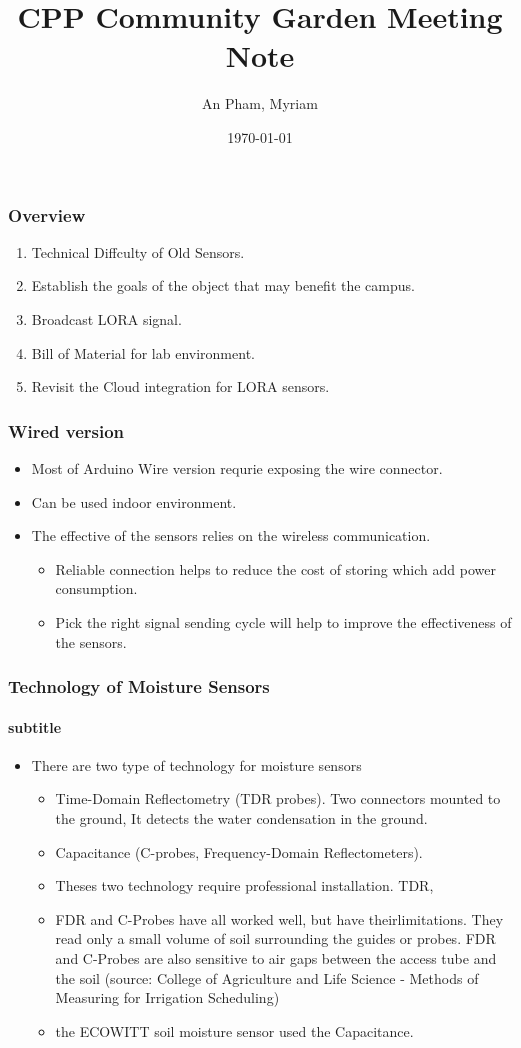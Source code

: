\documentclass{beamer}
\title{CPP Community Garden Meeting Note}
\author{An Pham, Myriam}
\institute{Calpoly Pomona}
\date{\today}
\begin{document}
\frame{\titlepage}

\begin{frame}
\frametitle{Overview}
\begin{enumerate}
  \item Technical Diffculty of Old Sensors.
  \item Establish the goals of the object that may benefit the campus.
  \item Broadcast LORA signal.
  \item Bill of Material for lab environment.
  \item Revisit the Cloud integration for LORA sensors. 
   
 \end{enumerate}
\end{frame}

\begin{frame}
  \frametitle{Wired version }
  \begin{itemize}
    \item Most of Arduino Wire version requrie exposing the wire connector. 
    \item Can be used indoor environment.
    \item The effective of the sensors relies on the wireless communication. 
      \begin{itemize}
        \item Reliable connection helps to reduce the cost of storing which add power consumption. 
	\item Pick the right signal sending cycle will help to improve the effectiveness of the sensors. 
      \end{itemize}
  \end{itemize}
 \end{frame}
 
 \begin{frame}[t]
   \frametitle{Technology of Moisture Sensors}
   \framesubtitle{subtitle}
   \begin{itemize}
     \item There are two type of technology for moisture sensors 
       \begin{itemize}
         \item Time-Domain Reflectometry (TDR probes). Two connectors mounted to the ground, It detects the water condensation in the ground. 
	 \item Capacitance (C-probes, Frequency-Domain Reflectometers). 
	 \item Theses two technology require professional installation. TDR, 
	   \item FDR and C-Probes have all worked well, but have theirlimitations. They read only a small volume of soil surrounding the guides or probes. FDR and C-Probes are also sensitive to air gaps between the access tube and the soil (source: College of Agriculture and Life Science - Methods of Measuring for Irrigation Scheduling)
	   \item the ECOWITT soil moisture sensor used the Capacitance.
       \end{itemize}
   \end{itemize}
 \end{frame}
\end{document}
